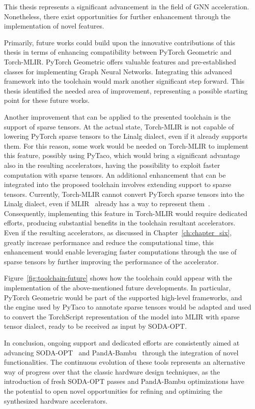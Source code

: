 This thesis represents a significant advancement in the field of GNN acceleration.
Nonetheless, there exist opportunities for further enhancement through the implementation of novel features.

Primarily, future works could build upon the innovative contributions of this thesis in terms of enhancing compatibility between PyTorch Geometric and Torch-MLIR\@.
PyTorch Geometric offers valuable features and pre-established classes for implementing Graph Neural Networks.
Integrating this advanced framework into the toolchain would mark another significant step forward.
This thesis identified the needed area of improvement, representing a possible starting point for these future works.

Another improvement that can be applied to the presented toolchain is the support of sparse tensors.
At the actual state, Torch-MLIR is not capable of lowering PyTorch sparse tensors to the Linalg dialect, even if it already supports them.
For this reason, some work would be needed on Torch-MLIR to implement this feature, possibly using PyTaco, which would bring a significant advantage also in the resulting accelerators, having the possibility to exploit faster computation with sparse tensors.
An additional enhancement that can be integrated into the proposed toolchain involves extending support to sparse tensors.
Currently, Torch-MLIR cannot convert PyTorch sparse tensors into the Linalg dialect, even if MLIR~\cite{9370308} already has a way to represent them~\cite{Bik_2022}.
Consequently, implementing this feature in Torch-MLIR would require dedicated efforts, producing substantial benefits in the toolchain resultant accelerators.
Even if the resulting accelerators, as discussed in Chapter~\ref{ch:chapter_six}, greatly increase performance and reduce the computational time, this enhancement would enable leveraging faster computations through the use of sparse tensors by further improving the performance of the accelerator.

Figure~\ref{fig:toolchain-future} shows how the toolchain could appear with the implementation of the above-mentioned future developments.
In particular, PyTorch Geometric would be part of the supported high-level frameworks, and the engine used by PyTaco to annotate sparse tensors would be adapted and used to convert the TorchScript representation of the model into MLIR with sparse tensor dialect, ready to be received as input by SODA-OPT\@.

In conclusion, ongoing support and dedicated efforts are consistently aimed at advancing SODA-OPT~\cite{9786533} and PandA-Bambu~\cite{9586110} through the integration of novel functionalities.
The continuous evolution of these tools represents an alternative way of progress over that the classic hardware design techniques, as the introduction of fresh SODA-OPT passes and PandA-Bambu optimizations have the potential to open novel opportunities for refining and optimizing the synthesized hardware accelerators.